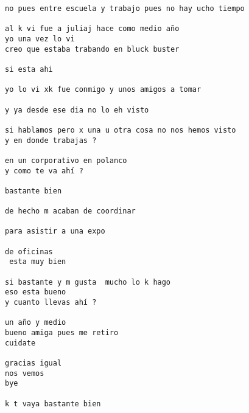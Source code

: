 \begin{verbatim}
no pues entre escuela y trabajo pues no hay ucho tiempo

al k vi fue a juliaj hace como medio año
yo una vez lo vi
creo que estaba trabando en bluck buster

si esta ahi

yo lo vi xk fue conmigo y unos amigos a tomar

y ya desde ese dia no lo eh visto

si hablamos pero x una u otra cosa no nos hemos visto
y en donde trabajas ?

en un corporativo en polanco
y como te va ahí ?

bastante bien

de hecho m acaban de coordinar

para asistir a una expo

de oficinas
 esta muy bien

si bastante y m gusta  mucho lo k hago
eso esta bueno
y cuanto llevas ahí ?

un año y medio
bueno amiga pues me retiro
cuidate

gracias igual
nos vemos
bye

k t vaya bastante bien
\end{verbatim}
